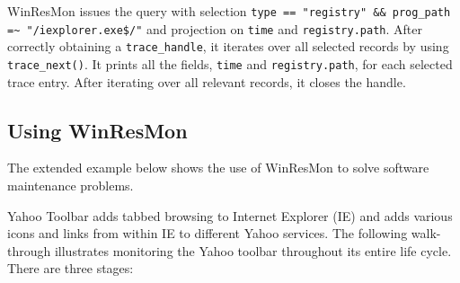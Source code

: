 \begin{itemize}
\noindent

WinResMon issues the query with selection {\small\tt type == "registry" \&\&
prog\_path =\~{} "/iexplorer.exe\$/"} and projection on {\small\tt time} and
{\small\tt registry.path}.  After correctly obtaining a {\small\tt trace\_handle}, it
iterates over all selected records by using {\small\tt trace\_next()}.  It prints
all the fields, {\small\tt time} and {\small\tt registry.path}, for each selected trace
entry.  After iterating over all relevant records, it closes the handle.

\end{itemize}


\subsection{Using WinResMon}

The extended example below shows the use of WinResMon to solve software
maintenance problems.

Yahoo Toolbar \cite{yahoo} adds tabbed browsing to Internet Explorer (IE) and
adds various icons and links from within IE to different Yahoo services.  The
following walk-through illustrates monitoring the Yahoo toolbar throughout its
entire life cycle.  There are three stages:

